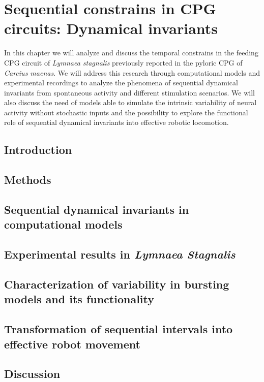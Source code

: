 \chapter{Sequential constrains in CPG circuits: Dynamical invariants}
\label{c-invariants}
In this chapter we will analyze and discuss the temporal constrains in the feeding CPG circuit of \textit{Lymnaea stagnalis} previously reported in the pyloric CPG of \textit{Carcius maenas}. We will address this research through computational models and experimental recordings to analyze the phenomena of sequential dynamical invariants from spontaneous activity and different stimulation scenarios. We will also discuss the need of models able to simulate the intrinsic variability of neural activity without stochastic inputs and the possibility to explore the functional role of sequential dynamical invariants into effective robotic locomotion.

\section{Introduction}

\section{Methods}

\section{Sequential dynamical invariants in computational models}
\label{c-invariants-model}

\section{Experimental results in \textit{Lymnaea Stagnalis}}
\label{sec:experimental sussex}

\section{Characterization of variability in bursting models and its functionality}
\label{sec:model variability}

\section{Transformation of sequential intervals into effective robot movement}
\label{sec:robot}

\section{Discussion}
